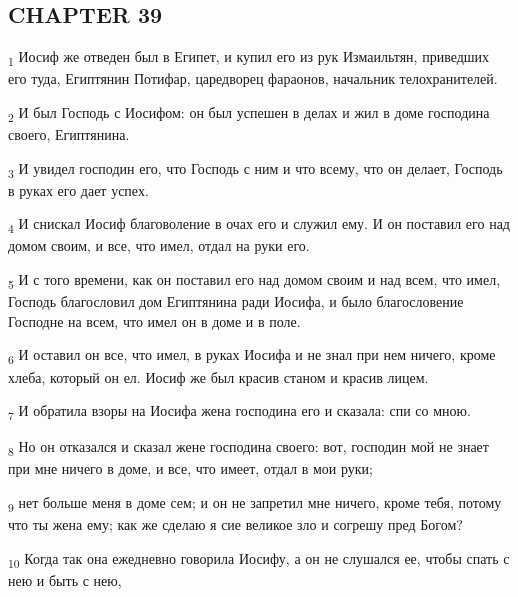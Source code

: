 \subsection{CHAPTER 39}
\begin{tcolorbox}
\textsubscript{1} Иосиф же отведен был в Египет, и купил его из рук Измаильтян, приведших его туда, Египтянин Потифар, царедворец фараонов, начальник телохранителей.
\end{tcolorbox}
\begin{tcolorbox}
\textsubscript{2} И был Господь с Иосифом: он был успешен в делах и жил в доме господина своего, Египтянина.
\end{tcolorbox}
\begin{tcolorbox}
\textsubscript{3} И увидел господин его, что Господь с ним и что всему, что он делает, Господь в руках его дает успех.
\end{tcolorbox}
\begin{tcolorbox}
\textsubscript{4} И снискал Иосиф благоволение в очах его и служил ему. И он поставил его над домом своим, и все, что имел, отдал на руки его.
\end{tcolorbox}
\begin{tcolorbox}
\textsubscript{5} И с того времени, как он поставил его над домом своим и над всем, что имел, Господь благословил дом Египтянина ради Иосифа, и было благословение Господне на всем, что имел он в доме и в поле.
\end{tcolorbox}
\begin{tcolorbox}
\textsubscript{6} И оставил он все, что имел, в руках Иосифа и не знал при нем ничего, кроме хлеба, который он ел. Иосиф же был красив станом и красив лицем.
\end{tcolorbox}
\begin{tcolorbox}
\textsubscript{7} И обратила взоры на Иосифа жена господина его и сказала: спи со мною.
\end{tcolorbox}
\begin{tcolorbox}
\textsubscript{8} Но он отказался и сказал жене господина своего: вот, господин мой не знает при мне ничего в доме, и все, что имеет, отдал в мои руки;
\end{tcolorbox}
\begin{tcolorbox}
\textsubscript{9} нет больше меня в доме сем; и он не запретил мне ничего, кроме тебя, потому что ты жена ему; как же сделаю я сие великое зло и согрешу пред Богом?
\end{tcolorbox}
\begin{tcolorbox}
\textsubscript{10} Когда так она ежедневно говорила Иосифу, а он не слушался ее, чтобы спать с нею и быть с нею,
\end{tcolorbox}
